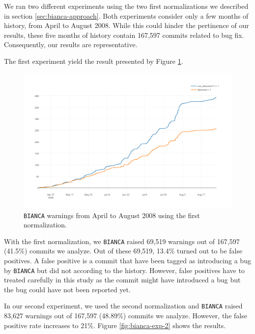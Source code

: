 We ran two different experiments using the two first normalizations we described in section \ref{sec:bianca-approach}. Both experiments consider only a few months of history, from April to August 2008. While this could hinder the pertinence of our results, these five months of history contain 167,597 commits related to bug fix. Consequently, our results are representative.

The first experiment yield the result presented by Figure \ref{fig:bianca-exp-1}.

\begin{figure}[h!]
  \centering
    \includegraphics[scale=0.55]{media/bianca-13.png}
    \caption{{\tt BIANCA} warnings from April to August 2008 using the first normalization.
    \label{fig:bianca-exp-1}}
\end{figure}

With the first normalization, we {\tt BIANCA} raised 69,519 warnings out of 167,597 (41.5\%) commits we analyze. Out of these 69,519, 13.4\% turned out to be false positives. A false positive is a commit that have been tagged as introducing a bug by {\tt BIANCA} but did not according to the history. However, false positives have to treated carefully in this study as the commit might have introduced a bug but the bug could have not been reported yet.

In our second experiment, we used the second normalization and {\tt BIANCA} raised 83,627 warnings out of 167,597 (48.89\%) commits we analyze. However, the false positive rate increases to 21\%. Figure \ref{fig:bianca-exp-2} shows the results.

